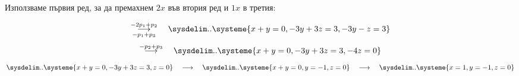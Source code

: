 \documentclass{subfiles}
\begin{document}
\noindent Използваме първия ред, за да премахнем $2x$ във втория ред и $1x$ в третия:

\begin{equation*}
    \overset{-2p_{1} + p_{2}}{\underset{-p_{1} + p_{3}}{\longrightarrow}}
    \quad
    \sysdelim..\systeme{
        x + y = 0,
        -3y + 3z = 3,
        -3y - z = 3
    }
\end{equation*}
\begin{equation*}
    \overset{-p_{2} + p_{3}}{\longrightarrow}
    \quad
    \sysdelim..\systeme{
        x + y = 0,
        -3y + 3z = 3,
        -4z = 0
    }
\end{equation*}
\begin{equation*}
    \sysdelim..\systeme{
        x + y = 0,
        -3y + 3z = 3,
        z = 0
    }
    \quad
    \longrightarrow
    \quad
    \sysdelim..\systeme{
        x + y = 0,
        y = -1,
        z = 0
    }
    \quad
    \longrightarrow
    \quad
    \sysdelim..\systeme{
        x = 1,
        y = -1,
        z = 0
    }
\end{equation*}
\end{document}
